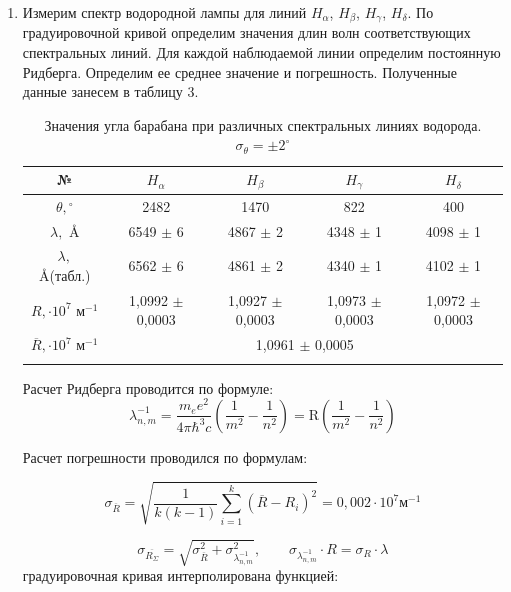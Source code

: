 \documentclass[a4paper, 12pt]{article}%
\begin{document}
\begin{enumerate}
		
		\item Измерим спектр водородной лампы для линий $H_\alpha$, $H_\beta$, $H_\gamma$, $H_\delta$. По градуировочной кривой определим значения длин волн соответствующих спектральных линий. Для каждой наблюдаемой линии определим постоянную Ридберга. Определим ее среднее значение и погрешность. Полученные данные занесем в таблицу 3.
		
		\begin{longtable}{|c|c|c|c|c|}
			\hline
			№ & $H_\alpha$ & $H_\beta$ & $H_\gamma$ & $H_\delta$  \\ \hline
			$\theta, {}^\circ$ & 2482 & 1470 & 822 & 400 \\ \hline
			$\lambda, $ \AA & 6549 $\pm $ 6 & 4867 $\pm $ 2 & 4348 $\pm $ 1 & 4098 $\pm $ 1 \\ \hline
			$\lambda, $ \AA (табл.) & 6562 $\pm $ 6 & 4861 $\pm $ 2 & 4340 $\pm $ 1 & 4102 $\pm $ 1 \\ \hline
			$R, \cdot 10^7\text{ м}^{-1}$ & 1,0992 $\pm $ 0,0003 & 1,0927 $\pm $ 0,0003& 1,0973 $\pm $ 0,0003& 1,0972 $\pm $ 0,0003\\ \hline
			$\overline{R},  \cdot 10^7\text{ м}^{-1}$ & \multicolumn{4}{c|}{1,0961 $\pm $ 0,0005}  \\ \hline 
			\caption{Значения угла барабана при различных спектральных линиях водорода. $\sigma_{\theta} = \pm2^\circ$}
		\end{longtable}
	
		Расчет Ридберга проводится по формуле:
			\begin{equation}
				\lambda_{n,m}^{-1} =\frac{m_ee^2}{4\pi\hbar^3c}\left(\frac{1}{m^2}-\frac{1}{n^2}\right) = \text{R} \left(\frac{1}{m^2}-\frac{1}{n^2}\right)
			\end{equation}
		
		 Расчет погрешности  проводился по формулам:
		
		\begin{equation}
			 \sigma_{\overline{R}} = \sqrt{\frac{1}{k(k-1)} \sum_{i = 1}^{k} (\overline{R} - {R_i})^2} = 0,002 \cdot 10^7\text{м}^{-1} 
		\end{equation}
		
		\begin{equation} 
			\sigma_{\overline{R_{\Sigma}}} = \sqrt{ \sigma_{\overline{R}} ^2 + \sigma_{\lambda_{n,m}^{-1}}^2 }, \qquad
			\sigma_{\lambda_{n,m}^{-1}}\cdot R = \sigma_{R} \cdot \lambda
		\end{equation}
	градуировочная кривая интерполирована функцией:
	

\end{enumerate}
\end{document}
